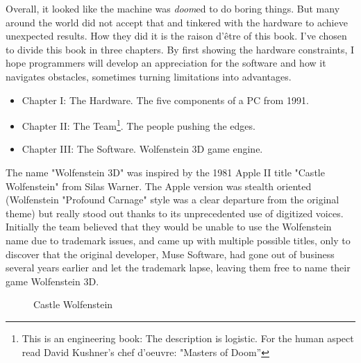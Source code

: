 Overall, it looked like the machine was \emph{doom}ed to do boring things. But many around the world did not accept that and tinkered with the hardware to achieve unexpected results. How they did it is the raison d'\^etre of this book. I've chosen to divide this book in three chapters. By first showing the hardware constraints, I hope programmers will develop an appreciation for the software and how it navigates obstacles, sometimes turning limitations into advantages.
\begin{itemize}
\item Chapter I: The Hardware. The five components of a PC from 1991.
\item Chapter II: The Team\footnote{This is an engineering book: The description is logistic. For the human aspect read David Kushner's chef d'oeuvre: "Masters of Doom''}. The people pushing the edges.
\item Chapter III: The Software. Wolfenstein 3D game engine.
\end{itemize}
\par
{} The name "Wolfenstein 3D" was inspired by the 1981 Apple II title "Castle Wolfenstein" from Silas Warner. The Apple version was stealth oriented (Wolfenstein "Profound Carnage" style was a clear departure from the original theme) but really stood out thanks to its unprecedented use of digitized voices. Initially the team believed that they would be unable to use the Wolfenstein name due to trademark issues, and came up with multiple possible titles, only to discover that the original developer, Muse Software, had gone out of business several years earlier and let the trademark lapse, leaving them free to name their game Wolfenstein 3D.

\begin{figure}[H]
\centering
{}
\caption{Castle Wolfenstein}
\end{figure}
